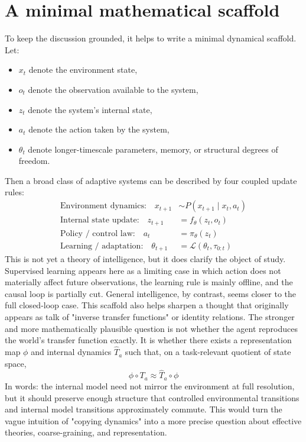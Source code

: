 \documentclass[11pt]{article}
\begin{document}
\section{A minimal mathematical scaffold}
To keep the discussion grounded, it helps to write a minimal dynamical scaffold. Let:
\begin{itemize}
\item $x_t$ denote the environment state,
\item $o_t$ denote the observation available to the system,
\item $z_t$ denote the system's internal state,
\item $a_t$ denote the action taken by the system,
\item $\theta_t$ denote longer-timescale parameters, memory, or structural degrees of freedom.
\end{itemize}
Then a broad class of adaptive systems can be described by four coupled update rules:
\begin{align}
\text{Environment dynamics:}\quad x_{t+1} &\sim P(x_{t+1}\mid x_t, a_t)\\
\text{Internal state update:}\quad z_{t+1} &= f_{\theta}(z_t, o_t)\\
\text{Policy / control law:}\quad a_t &= \pi_{\theta}(z_t)\\
\text{Learning / adaptation:}\quad \theta_{t+1} &= \mathcal{L}(\theta_t, \tau_{0:t})
\end{align}
This is not yet a theory of intelligence, but it does clarify the object of study. Supervised learning appears here as a limiting case in which action does not materially affect future observations, the learning rule is mainly offline, and the causal loop is partially cut. General intelligence, by contrast, seems closer to the full closed-loop case. This scaffold also helps sharpen a thought that originally appears as talk of "inverse transfer functions" or identity relations. The stronger and more mathematically plausible question is not whether the agent reproduces the world's transfer function exactly. It is whether there exists a representation map $\phi$ and internal dynamics $\hat{T}_a$ such that, on a task-relevant quotient of state space,
\begin{equation}
\phi \circ T_a \approx \hat{T}_a \circ \phi
\end{equation}
In words: the internal model need not mirror the environment at full resolution, but it should preserve enough structure that controlled environmental transitions and internal model transitions approximately commute. This would turn the vague intuition of "copying dynamics" into a more precise question about effective theories, coarse-graining, and representation.
\end{document}
